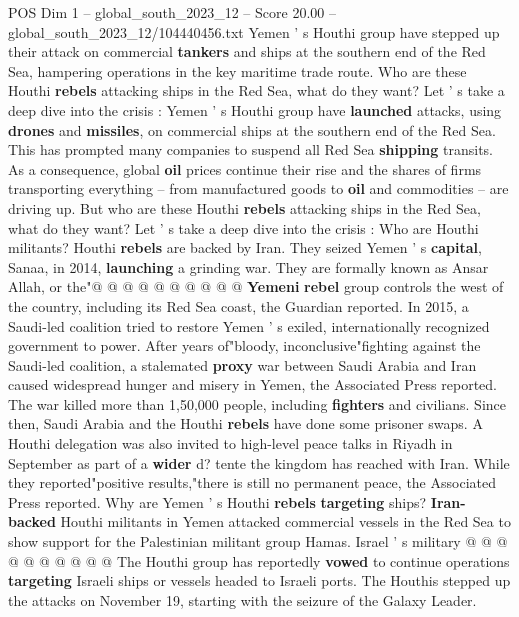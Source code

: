 \begin{textsample}{POS Dim 1 – global\_south\_2023\_12 – Score 20.00 – global\_south\_2023\_12/104440456.txt}  \label{ex:f1_pos_164}
Yemen ' s Houthi group have stepped up their attack on commercial \textbf{tankers} and ships at the southern end of the Red Sea, hampering operations in the key maritime trade route.
Who are these Houthi \textbf{rebels} attacking ships in the Red Sea, what do they want?
Let ' s take a deep dive into the crisis : Yemen ' s Houthi group have \textbf{launched} attacks, using \textbf{drones} and \textbf{missiles}, on commercial ships at the southern end of the Red Sea.
This has prompted many companies to suspend all Red Sea \textbf{shipping} transits.
As a consequence, global \textbf{oil} prices continue their rise and the shares of firms transporting everything -- from manufactured goods to \textbf{oil} and commodities -- are driving up.
But who are these Houthi \textbf{rebels} attacking ships in the Red Sea, what do they want?
Let ' s take a deep dive into the crisis : Who are Houthi militants?
Houthi \textbf{rebels} are backed by Iran.
They seized Yemen ' s \textbf{capital}, Sanaa, in 2014, \textbf{launching} a grinding war.
They are formally known as Ansar Allah, or the"@ @ @ @ @ @ @ @ @ @ \textbf{Yemeni} \textbf{rebel} group controls the west of the country, including its Red Sea coast, the Guardian reported.
In 2015, a Saudi-led coalition tried to restore Yemen ' s exiled, internationally recognized government to power.
After years of"bloody, inconclusive"fighting against the Saudi-led coalition, a stalemated \textbf{proxy} war between Saudi Arabia and Iran caused widespread hunger and misery in Yemen, the Associated Press reported.
The war killed more than 1,50,000 people, including \textbf{fighters} and civilians.
Since then, Saudi Arabia and the Houthi \textbf{rebels} have done some prisoner swaps.
A Houthi delegation was also invited to high-level peace talks in Riyadh in September as part of a \textbf{wider} d? tente the kingdom has reached with Iran.
While they reported"positive results,"there is still no permanent peace, the Associated Press reported.
Why are Yemen ' s Houthi \textbf{rebels} \textbf{targeting} ships? \textbf{Iran-backed} Houthi militants in Yemen attacked commercial vessels in the Red Sea to show support for the Palestinian militant group Hamas.
Israel ' s military @ @ @ @ @ @ @ @ @ @ The Houthi group has reportedly \textbf{vowed} to continue operations \textbf{targeting} Israeli ships or vessels headed to Israeli ports.
The Houthis stepped up the attacks on November 19, starting with the seizure of the Galaxy Leader.

\end{textsample}
